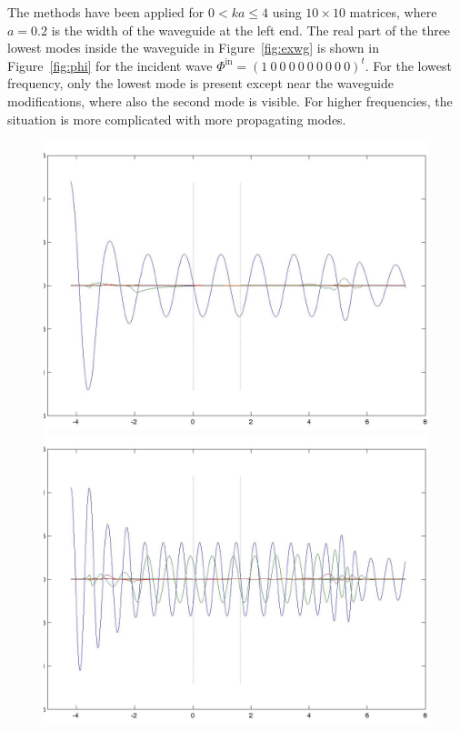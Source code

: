 \documentclass{svjour3}
\renewcommand{\Phi}{\varPhi}
\renewcommand{\vec}[1]{\bm{#1}}
\renewcommand{\Phi}{\varPhi}
\newcommand{\Phiin}{\vec\Phi^{\text{in}}}
\begin{document}
The methods have been applied for $0<ka\le4$ using $10\times10$
matrices, where $a=0.2$ is the width of the waveguide at the left
end. The real part of the three lowest modes inside the waveguide in
Figure~\ref{fig:exwg} is shown in Figure~\ref{fig:phi} for the
incident wave $\Phiin=(1\ 0\ 0\ 0\ 0\ 0\ 0\ 0\ 0\ 0)^t$. For the
lowest frequency, only the lowest mode is present except near the
waveguide modifications, where also the second mode is visible. For
higher frequencies, the situation is more complicated with more
propagating modes.

\begin{figure}[t]
  \centering
  \includegraphics[width=\linewidth]{phin1a}
  \includegraphics[width=\linewidth]{phin2a}

\end{figure}
\end{document}
